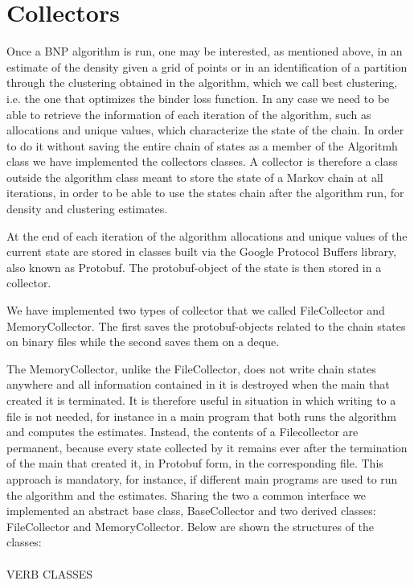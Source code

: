 \chapter{Collectors}

Once a BNP algorithm is run, one may be interested, as mentioned above, in an estimate of the density given a grid of points or in an identification of a partition through the clustering obtained in the algorithm, which we call best clustering, i.e. the one that optimizes the binder loss function. In any case we need to be able to retrieve the information of each iteration of the algorithm, such as allocations and unique values, which characterize the state of the chain. In order to do it without saving the entire chain of states as a member of the Algoritmh class we have implemented the collectors classes. 
A collector is therefore a class outside the algorithm class meant to store the state of a Markov chain at all iterations, in order to be able to use the states chain after the algorithm run, for density and clustering estimates. 

At the end of each iteration of the algorithm allocations and unique values of the current state are stored in classes built via the Google Protocol Buffers library, also known as Protobuf. The protobuf-object of the state is then stored in a collector.


We have implemented two types of collector that we called FileCollector and MemoryCollector.
The first saves the protobuf-objects related to the chain states on binary files while the second saves them on a deque.

The MemoryCollector, unlike the FileCollector, does not write chain states anywhere and all information contained in it is destroyed when the main that created it is terminated. It is therefore useful in situation in which writing to a file is not needed, for instance in a main program that both runs the algorithm and computes the estimates.
Instead, the contents of a Filecollector are permanent, because every state collected by it remains ever after the termination of the main that created it, in Protobuf form, in the corresponding file. This approach is mandatory, for instance, if different main programs are used to run the algorithm and the estimates. 
Sharing the two a common interface we implemented an abstract base class, BaseCollector and two derived classes: FileCollector and MemoryCollector.
Below are shown the structures of the classes:
\\\\ VERB CLASSES


